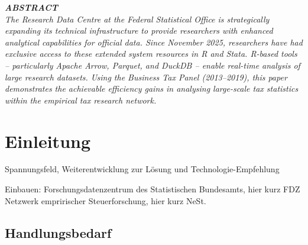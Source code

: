 \documentclass[
  german,
  10pt,
  twoside]{article}
\renewcommand*\contentsname{Inhaltsverzeichnis}
\newcommand\contentsname{Inhaltsverzeichnis}
\begin{document}
\begin{titlepage}
\begin{minipage}[t]{11.8cm}
\vspace{0.3cm}

{\itshape\color{wistaDarkGray}\bfseries\MakeUppercase{Abstract}}\\[0.15cm]
\small\itshape
The Research Data Centre at the Federal Statistical Office is strategically expanding its technical infrastructure to provide researchers with enhanced analytical capabilities for official data. Since November 2025, researchers have had exclusive access to these extended system resources in R and Stata. R-based tools -- particularly Apache Arrow, Parquet, and DuckDB -- enable real-time analysis of large research datasets. Using the Business Tax Panel (2013--2019), this paper demonstrates the achievable efficiency gains in analysing large-scale tax statistics within the empirical tax research network.

\end{minipage}

\vfill

\vspace{0.5cm}
\noindent{}

\end{titlepage}

\pagestyle{fancy}

\renewcommand*\contentsname{Inhaltsverzeichnis}
{
\hypersetup{linkcolor=}
\setcounter{tocdepth}{3}
\tableofcontents
}

\clearpage
\twocolumn

\section{Einleitung}\label{sec-einleitung}

Spannungsfeld, Weiterentwicklung zur Lösung und Technologie-Empfehlung

Einbauen: Forschungsdatenzentrum des Statistischen Bundesamts, hier kurz
FDZ Netzwerk empririscher Steuerforschung, hier kurz NeSt.

\subsection{Handlungsbedarf}\label{handlungsbedarf}
\end{document}
